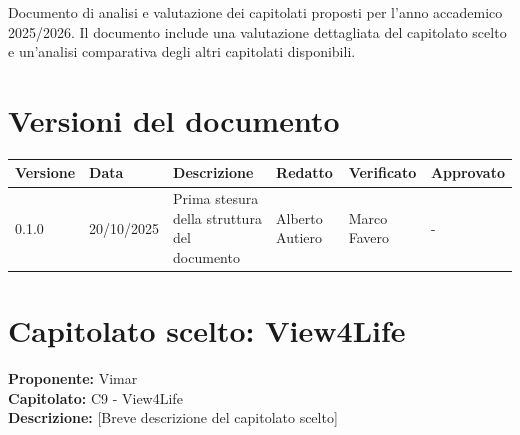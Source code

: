 \documentclass[a4paper,12pt]{article}
\newcommand{\CurrentVersion}{0.1.0} %
\begin{document}
\vspace{0.5cm}

\begin{center}
\begin{tcolorbox}[colback=secondaryblue!10,colframe=secondaryblue,width=0.9\textwidth,arc=3mm,boxrule=0.8pt,title={\bfseries Abstract}]
Documento di analisi e valutazione dei capitolati proposti per l'anno accademico 2025/2026. Il documento include una valutazione dettagliata del capitolato scelto e un'analisi comparativa degli altri capitolati disponibili.
\end{tcolorbox}
\end{center}

\newpage
\section{Versioni del documento}

{\footnotesize %
\begin{tabularx}{\textwidth}{|p{1.5cm}|p{2cm}|X|p{2cm}|p{2cm}|p{2cm}|}
\hline
\rowcolor{gray!40} %
\textbf{Versione} & \textbf{Data} & \textbf{Descrizione} & \textbf{Redatto} & \textbf{Verificato} & \textbf{Approvato} \\
\hline
\CurrentVersion & 20/10/2025 & Prima stesura della struttura del documento & Alberto Autiero & Marco Favero & - \\
\hline
\end{tabularx}
}

\newpage

\renewcommand{\cftsecpagefont}{\normalfont}
\renewcommand{\cftsecleader}{\cftdotfill{\cftsecdotsep}}
\setlength{\cftbeforesecskip}{2pt}
\begin{center}
\begin{tcolorbox}[colback=lightgray,colframe=darkgray,width=0.9\textwidth,arc=2mm,boxrule=0.5pt]
\tableofcontents
\end{tcolorbox}
\end{center}

\newpage

\section{Capitolato scelto: View4Life}

\begin{tcolorbox}[colback=secondaryblue!5,colframe=secondaryblue,arc=2mm,boxrule=0.5pt]
\textbf{Proponente:} Vimar \\
\textbf{Capitolato:} C9 - View4Life \\
\textbf{Descrizione:} [Breve descrizione del capitolato scelto]
\end{tcolorbox}
\end{document}
